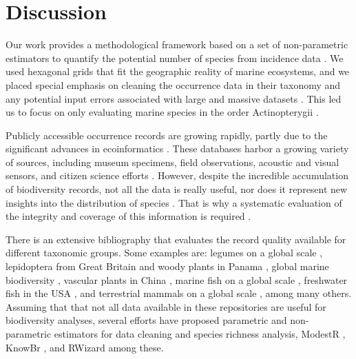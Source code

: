 \documentclass[12pt,authoryear]{elsarticle}
\begin{document}
\section{Discussion}

Our work provides a methodological framework based on a set of non-parametric estimators to quantify the potential number of species from incidence data \citep{chao2009}. We used hexagonal grids that fit the geographic reality of marine ecosystems, and we placed special emphasis on cleaning the occurrence data in their taxonomy \citep{jin2020bdcleaner} and any potential input errors associated with large and massive datasets \citep{zizka2020}. This led us to focus on only evaluating marine species in the order Actinopterygii \citep{alo2021macroecology}.

Publicly accessible occurrence records are growing rapidly, partly due to the significant advances in ecoinformatics  
\citep{lenoir2020species,oliver2021}. These databases harbor a growing variety of sources, including museum specimens, field observations, acoustic and visual sensors, and citizen science efforts \citep{amano2016}. However, despite the incredible accumulation of biodiversity records, not all the data is really useful, nor does it represent new insights into the distribution of species 
\citep{bayraktarov2019,zizka2020}. That is why a systematic evaluation of the integrity and coverage of this information is required \citep{troia2017}.

There is an extensive bibliography that evaluates the record quality available for different taxonomic groups. Some examples are: legumes on a global scale \citep{yesson2007}, lepidoptera from Great Britain and woody plants in Panama \citep{chao2009}, global marine biodiversity \citep{tittensor2010global}, vascular plants in China \citep{yang2013geographical}, marine fish on a global scale \citep{mora2008completeness,garcia2015}, freshwater fish in the USA \citep{troia2017,pelayo2018}, and terrestrial mammals on a global scale \citep{oliver2021}, among many others. Assuming that that not all data available in these repositories are useful for biodiversity analyses, several efforts have proposed  parametric and non-parametric estimators for data cleaning and species richness analysis, ModestR \citep{garcia2013}, KnowBr \citep{lobo2018}, and RWizard \citep{guisande&lobo} among these.
\end{document}
